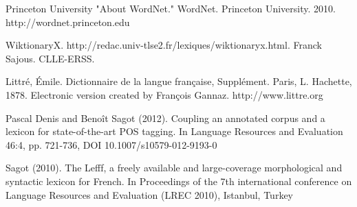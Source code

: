 \documentclass[a4paper, 12pt]{article}
\begin{document}
\begin{thebibliography}{10}

Princeton University "About WordNet." WordNet. Princeton University. 2010. http://wordnet.princeton.edu \label{bib:wordnet}

WiktionaryX. http://redac.univ-tlse2.fr/lexiques/wiktionaryx.html. Franck Sajous. CLLE-ERSS. \label{bib:wikixml}

Littré, Émile. Dictionnaire de la langue française, Supplément. Paris, L. Hachette, 1878. Electronic version created by François Gannaz. http://www.littre.org \label{bib:littrexml}

Pascal Denis and Benoît Sagot (2012). Coupling an annotated corpus and a lexicon for state-of-the-art POS tagging. In Language Resources and Evaluation 46:4, pp. 721-736, DOI 10.1007/s10579-012-9193-0\label{bib:melt} 

Sagot (2010). The Lefff, a freely available and large-coverage morphological and syntactic lexicon for French. In Proceedings of the 7th international conference on Language Resources and Evaluation (LREC 2010), Istanbul, Turkey\label{bib:lefff} 

\end{thebibliography}
\end{document}
